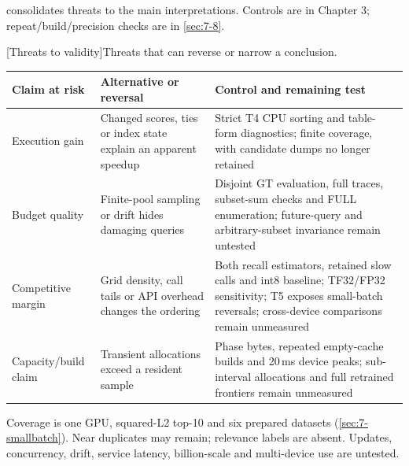  consolidates threats to the main interpretations.
Controls are in Chapter 3; repeat/build/precision checks are in \cref{sec:7-8}.


\par\medskip\noindent\begin{minipage}{\linewidth}
\centering\captionsetup{hypcap=false}
[Threats to validity]{Threats that can reverse or narrow a conclusion.}
\label{tab:8-threats}
\footnotesize\setlength{\tabcolsep}{4pt}
\begin{tabularx}{\linewidth}{@{}*{3}{>{\raggedright\arraybackslash}X}@{}}
\toprule
Claim at risk & Alternative or reversal & Control and remaining test \\
\midrule
Execution gain & Changed scores, ties or index state explain an apparent
speedup & Strict T4 CPU sorting and table-form diagnostics; finite
coverage, with candidate dumps no longer retained \\
Budget quality & Finite-pool sampling or drift hides damaging queries
& Disjoint GT evaluation, full traces, subset-sum checks and FULL
enumeration; future-query and arbitrary-subset invariance remain untested \\
Competitive margin & Grid density, call tails or API overhead changes
the ordering & Both recall estimators, retained slow calls and int8
baseline; TF32/FP32 sensitivity; T5 exposes small-batch reversals;
cross-device comparisons remain unmeasured \\
Capacity/build claim & Transient allocations exceed a resident sample
& Phase bytes, repeated empty-cache builds and 20\,ms device peaks;
sub-interval allocations and full retrained frontiers remain unmeasured \\
\bottomrule
\end{tabularx}
\end{minipage}\par\medskip

Coverage is one GPU, squared-L2 top-10 and six prepared datasets (\cref{sec:7-smallbatch}). Near duplicates may remain; relevance labels are absent. Updates, concurrency, drift, service latency, billion-scale and multi-device use are untested.